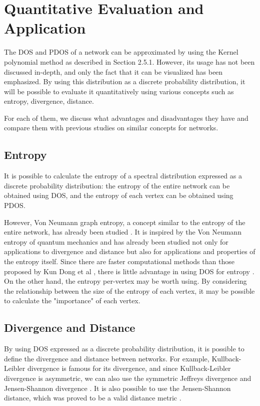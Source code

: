 \documentclass[senior,final,11pt]{iscs-thesis}
\begin{document}
\section{Quantitative Evaluation and Application}
The DOS and PDOS of a network can be approximated by using the Kernel polynomial method as described in Section 2.5.1. However, its usage has not been discussed in-depth, and only the fact that it can be visualized has been emphasized.
By using this distribution as a discrete probability distribution, it will be possible to evaluate it quantitatively using various concepts such as entropy, divergence, distance.

For each of them, we discuss what advantages and disadvantages they have and compare them with previous studies on similar concepts for networks.

\subsection{Entropy}
It is possible to calculate the entropy of a spectral distribution expressed as a discrete probability distribution: the entropy of the entire network can be obtained using DOS, and the entropy of each vertex can be obtained using PDOS.

However, Von Neumann graph entropy, a concept similar to the entropy of the entire network, has already been studied \cite{braunstein2006laplacian, chen2019fast,tsitsulin2020just}. It is inspired by the Von Neumann entropy of quantum mechanics and has already been studied not only for applications to divergence and distance but also for applications and properties of the entropy itself. Since there are faster computational methods \cite{chen2019fast,tsitsulin2020just} than those proposed by Kun Dong et al \cite{dong2019network}, there is little advantage in using DOS for entropy .
On the other hand, the entropy per-vertex may be worth using. By considering the relationship between the size of the entropy of each vertex, it may be possible to calculate the "importance" of each vertex.


\subsection{Divergence and Distance}
By using DOS expressed as a discrete probability distribution, it is possible to define the divergence and distance between networks. For example, Kullback-Leibler divergence \cite{kullback1951information} is famous for its divergence, and since Kullback-Leibler divergence is asymmetric, we can also use the symmetric Jeffreys divergence and Jensen-Shannon divergence \cite{nielsen2019jensen, lin1991divergence, jeffreys1946invariant}. It is also possible to use the Jensen-Shannon distance, which was proved to be a valid distance metric \cite{endres2003new}.
\end{document}
